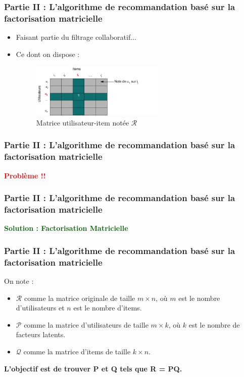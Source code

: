 \newcommand{\PartII}{Partie II : L'algorithme de recommandation basé sur la factorisation matricielle}

\begin{frame}
	 \frametitle{\PartII}
\begin{itemize}
	\item Faisant partie du filtrage collaboratif...
	\item {
		Ce dont on dispose :
		\begin{figure}[htbp]
			\centering
			\hspace{80pt}
			\includegraphics[width=0.6\textwidth]{ressources/matrix_users_items.png}
			\caption{Matrice utilisateur-item notée $\mathcal{R}$}
			\label{fig:matrix-user-item}
		\end{figure}
	}
\end{itemize}
\end{frame}

\begin{frame}
	\frametitle{\PartII}
\begin{center}
	\textcolor{red}{\textbf{\large{Problème !!}}}
\end{center}
\end{frame}

\begin{frame}
	 \frametitle{\PartII}
	\begin{center}
		\textcolor{darkgreen}{\textbf{\large{Solution : Factorisation Matricielle}}}
	\end{center}
\end{frame}

\begin{frame}
	 \frametitle{\PartII}
	On note :
	\begin{itemize}
		\item $\mathcal{R}$ comme la matrice originale de taille $m \times n$, où $m$ est le nombre d'utilisateurs et $n$ est le nombre d'items.
		\item $\mathcal{P}$ comme la matrice d'utilisateurs de taille $m \times k$, où $k$ est le nombre de facteurs latents.
		\item $\mathcal{Q}$ comme la matrice d'items de taille $k \times n$.
	\end{itemize}
	\begin{center}
				\textbf{L'objectif est de trouver P et Q tels que R = PQ.}
	\end{center}
\end{frame}

